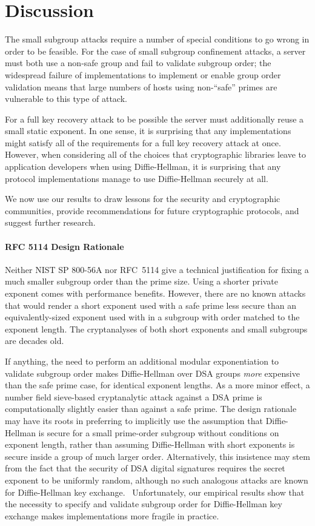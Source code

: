 
\section{Discussion}

The small subgroup attacks require a number of special conditions to go wrong
in order to be feasible. For the case of small subgroup confinement attacks, a
server must both use a non-safe group and fail to validate subgroup order; the
widespread failure of implementations to implement or enable group order validation
means that large numbers of hosts using non-``safe'' primes are vulnerable to this type of attack.

For a full key recovery attack to be possible the server must additionally
reuse a small static exponent.  In one sense, it is surprising that any
implementations might satisfy all of the requirements for a full key recovery
attack at once.  However, when considering all of the choices that
cryptographic libraries leave to application developers when using
Diffie-Hellman, it is surprising that any protocol implementations manage to
use Diffie-Hellman securely at all. 

We now use our results to draw lessons for the security and cryptographic
communities, provide recommendations for future cryptographic protocols, and
suggest further research.

\paragraph{RFC 5114 Design Rationale} Neither NIST SP 800-56A nor RFC~5114 give
a technical justification for fixing a much smaller subgroup order than the
prime size. Using a shorter private exponent comes with performance benefits.
However, there are no known attacks that would render a short exponent used with
a safe prime less secure than an equivalently-sized exponent used with in a
subgroup with order matched to the exponent length. The cryptanalyses of both short 
exponents and small subgroups are decades old.

If anything, the need to
perform an additional modular exponentiation to validate subgroup order makes
Diffie-Hellman over DSA groups \textit{more} expensive than the safe prime
case, for identical exponent lengths. As a more minor effect, a number field
sieve-based cryptanalytic attack against a DSA prime is computationally
slightly easier than against a safe prime.  The design rationale may have its
roots in preferring to implicitly use the assumption that Diffie-Hellman is
secure for a small prime-order subgroup without conditions on exponent length,
rather than assuming Diffie-Hellman with short exponents is secure inside a
group of much larger order.  Alternatively, this insistence may stem from the
fact that the security of DSA digital signatures requires the secret exponent
to be uniformly random, although no such analogous attacks are known for
Diffie-Hellman key exchange.~\cite{nguyen-2002}
Unfortunately, our empirical results show that the necessity to specify and validate subgroup order for Diffie-Hellman key exchange makes implementations more fragile in practice.

